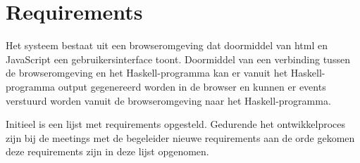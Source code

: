 \chapter{Requirements} \label{hoofdstuk:requirements}


Het systeem bestaat uit een browseromgeving dat doormiddel van html en JavaScript een gebruikersinterface toont. Doormiddel van een verbinding tussen de browseromgeving en het Haskell-programma kan er vanuit het Haskell-programma output gegenereerd worden in de browser en kunnen er events verstuurd worden vanuit de browseromgeving naar het Haskell-programma.

Initieel is een lijst met requirements opgesteld. Gedurende het ontwikkelproces zijn bij de meetings met de begeleider nieuwe requirements aan de orde gekomen deze requirements zijn in deze lijst opgenomen.

